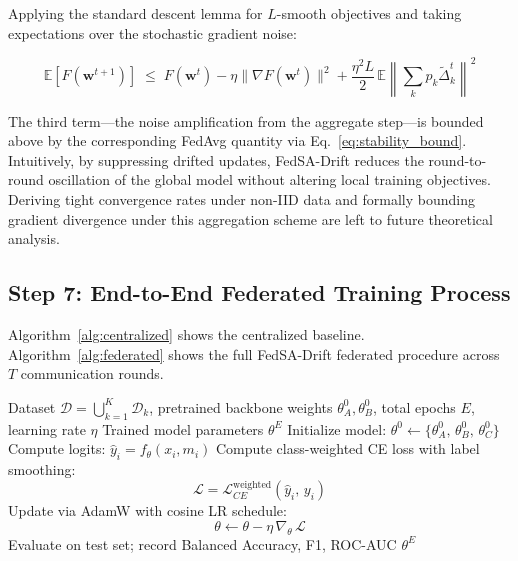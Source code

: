 \documentclass{ieeeaccess}
\newcommand{\sadrift}{FedSA-Drift}
\begin{document}
Applying the standard descent lemma for $L$-smooth objectives and taking expectations over the stochastic gradient noise:

\begin{equation}
\label{eq:convergence}
\mathbb{E}[F(\mathbf{w}^{t+1})]
\;\le\;
F(\mathbf{w}^t)
- \eta \|\nabla F(\mathbf{w}^t)\|^2
+ \frac{\eta^2 L}{2}\,\mathbb{E}\!\left\|\sum_k p_k \tilde{\Delta}_k^t\right\|^2
\end{equation}

The third term—the noise amplification from the aggregate step—is bounded above by the corresponding FedAvg quantity via Eq.~\eqref{eq:stability_bound}. Intuitively, by suppressing drifted updates, \sadrift{} reduces the round-to-round oscillation of the global model without altering local training objectives. Deriving tight convergence rates under non-IID data and formally bounding gradient divergence under this aggregation scheme are left to future theoretical analysis.

\subsection{Step 7: End-to-End Federated Training Process}

Algorithm~\ref{alg:centralized} shows the centralized baseline. Algorithm~\ref{alg:federated} shows the full \sadrift{} federated procedure across $T$ communication rounds.

\begin{algorithm}[t]
\caption{Centralized Training Baseline}
\label{alg:centralized}
\begin{algorithmic}[1]
\REQUIRE Dataset $\mathcal{D} = \bigcup_{k=1}^{K} \mathcal{D}_k$, pretrained backbone weights $\theta_A^0, \theta_B^0$, total epochs $E$, learning rate $\eta$
\ENSURE Trained model parameters $\theta^E$
\STATE Initialize model: $\theta^0 \leftarrow \{\theta_A^0,\, \theta_B^0,\, \theta_C^0\}$
        \STATE Compute logits: $\hat{y}_i = f_\theta(x_i, m_i)$
        \STATE Compute class-weighted CE loss with label smoothing:
               \[ \mathcal{L} = \mathcal{L}_{CE}^{\text{weighted}}(\hat{y}_i,\, y_i) \]
        \STATE Update via AdamW with cosine LR schedule:
               \[ \theta \leftarrow \theta - \eta\,\nabla_\theta\,\mathcal{L} \]
    \ENDFOR
    \STATE Evaluate on test set; record Balanced Accuracy, F1, ROC-AUC
\ENDFOR
\RETURN $\theta^E$
\end{algorithmic}
\end{algorithm}
\end{document}
